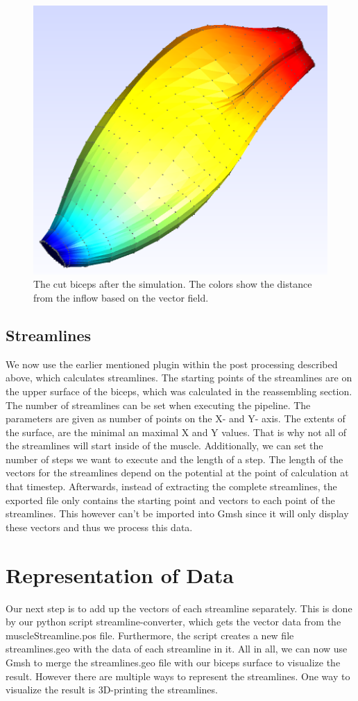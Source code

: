 \documentclass[preprint,journal]{vgtc}       %
\begin{document}
\begin{figure}
	\begin{center}
		\includegraphics[width=.7\linewidth]{Sim.png}
	\end{center}
	\caption{The cut biceps after the simulation. The colors show the distance from the inflow based on the vector field.}
	\label{fig:sim}
\end{figure}

\subsection{Streamlines}
We now use the earlier mentioned plugin within the post processing described above, which calculates streamlines. 
The starting points of the streamlines are on the upper surface of the biceps, which was calculated in the reassembling section. 
The number of streamlines can be set when executing the pipeline.
The parameters are given as number of points on the X- and Y- axis. 
The extents of the surface, are the minimal an maximal X and Y values. 
That is why not all of the streamlines will start inside of the muscle. 
Additionally, we can set the number of steps we want to execute  and the length of a step.
The length of the vectors for the streamlines depend on the potential at the point of calculation at that timestep.
Afterwards, instead of extracting the complete streamlines, the exported file only contains the starting point and vectors to each point of the streamlines. 
This however can't be imported into Gmsh since it will only display these vectors and thus we process this data. 

\section{Representation of Data}
Our next step is to add up the vectors of each streamline separately. 
This is done by our python script streamline-converter, which gets the vector data from the muscleStreamline.pos file. 
Furthermore, the script creates a new file streamlines.geo with the data of each streamline in it. 
All in all, we can now use Gmsh to merge the streamlines.geo file with our biceps surface to visualize the result. 
However there are multiple ways to represent the streamlines. 
One way to visualize the result is 3D-printing the streamlines.
\end{document}
